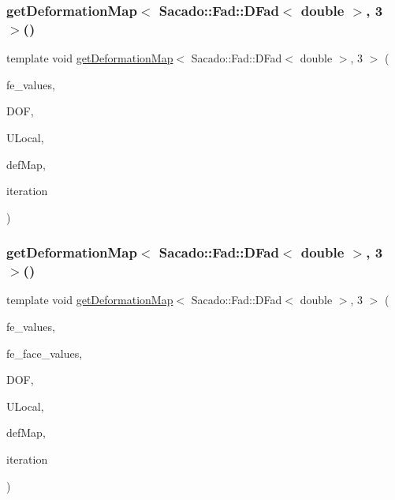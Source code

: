 \subsubsection{\texorpdfstring{getDeformationMap$<$ Sacado::Fad::DFad$<$ double $>$, 3 $>$()}{getDeformationMap< Sacado::Fad::DFad< double >, 3 >()}\hspace{0.1cm}{\footnotesize\ttfamily [1/2]}}
{\footnotesize\ttfamily template void \mbox{\hyperlink{group___evaluation_functions_ga239b206235603af9482484c29c8d57ea}{get\+Deformation\+Map}}$<$ Sacado\+::\+Fad\+::\+D\+Fad$<$ double $>$, 3 $>$ (\begin{DoxyParamCaption}\item[{const F\+E\+Values$<$ 3 $>$ \&}]{fe\+\_\+values,  }\item[{unsigned int}]{D\+OF,  }\item[{Table$<$ 1, Sacado\+::\+Fad\+::\+D\+Fad$<$ double $>$$>$ \&}]{U\+Local,  }\item[{\mbox{\hyperlink{structdeformation_map}{deformation\+Map}}$<$ Sacado\+::\+Fad\+::\+D\+Fad$<$ double $>$, 3 $>$ \&}]{def\+Map,  }\item[{unsigned int}]{iteration }\end{DoxyParamCaption})}

\mbox{\label{function_evaluations_8cc_a2b4c316f681796502a2308af3aaf6627}} 
\subsubsection{\texorpdfstring{getDeformationMap$<$ Sacado::Fad::DFad$<$ double $>$, 3 $>$()}{getDeformationMap< Sacado::Fad::DFad< double >, 3 >()}\hspace{0.1cm}{\footnotesize\ttfamily [2/2]}}
{\footnotesize\ttfamily template void \mbox{\hyperlink{group___evaluation_functions_ga239b206235603af9482484c29c8d57ea}{get\+Deformation\+Map}}$<$ Sacado\+::\+Fad\+::\+D\+Fad$<$ double $>$, 3 $>$ (\begin{DoxyParamCaption}\item[{const F\+E\+Values$<$ 3 $>$ \&}]{fe\+\_\+values,  }\item[{const F\+E\+Face\+Values$<$ 3 $>$ \&}]{fe\+\_\+face\+\_\+values,  }\item[{unsigned int}]{D\+OF,  }\item[{Table$<$ 1, Sacado\+::\+Fad\+::\+D\+Fad$<$ double $>$$>$ \&}]{U\+Local,  }\item[{\mbox{\hyperlink{structdeformation_map}{deformation\+Map}}$<$ Sacado\+::\+Fad\+::\+D\+Fad$<$ double $>$, 3 $>$ \&}]{def\+Map,  }\item[{unsigned int}]{iteration }\end{DoxyParamCaption})}

